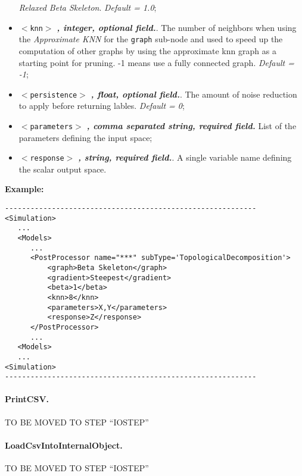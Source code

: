 \begin{itemize}
        \textit{Relaxed Beta Skeleton}. \textit{Default = 1.0};
  \item $<$\texttt{knn}$>$ \textbf{\textit{, integer, optional field.}}. The
        number of neighbors when using the \textit{Approximate KNN} for the
        \texttt{graph} sub-node and used to speed up the computation of other
        graphs by using the approximate knn graph as a starting point for
        pruning. -1 means use a fully connected graph. \textit{Default = -1};
  \item $<$\texttt{persistence}$>$ \textbf{\textit{, float, optional field.}}. 
        The amount of noise reduction to apply before returning lables. 
        \textit{Default = 0};
  \item $<$\texttt{parameters}$>$ \textbf{\textit{, comma separated string,
        required field.}} List of the parameters defining the input space;
  \item $<$\texttt{response}$>$ \textbf{\textit{, string, required field.}}. 
        A single variable name defining the scalar output space.
\end{itemize}
\textbf{Example:}
\begin{lstlisting}[style=XML]
-----------------------------------------------------------
<Simulation>
   ...
   <Models>
      ...
      <PostProcessor name="***" subType='TopologicalDecomposition'>
          <graph>Beta Skeleton</graph>
          <gradient>Steepest</gradient>
          <beta>1</beta>
          <knn>8</knn>
          <parameters>X,Y</parameters>
          <response>Z</response>
      </PostProcessor>
      ...
   <Models>
   ...
<Simulation>
-----------------------------------------------------------
\end{lstlisting}
\paragraph{PrintCSV.}
\label{PrintCSV}
TO BE MOVED TO STEP ``IOSTEP''
\paragraph{LoadCsvIntoInternalObject.}
\label{LoadCsvIntoInternalObject}
TO BE MOVED TO STEP ``IOSTEP''
